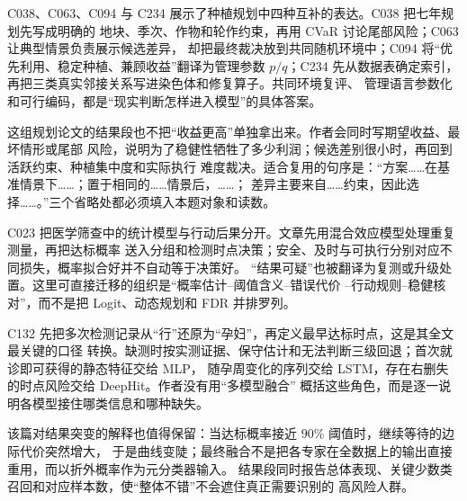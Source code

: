 C038、C063、C094 与 C234 展示了种植规划中四种互补的表达。C038 把七年规划先写成明确的
地块、季次、作物和轮作约束，再用 CVaR 讨论尾部风险；C063 让典型情景负责展示候选差异，
却把最终裁决放到共同随机环境中；C094 将“优先利用、稳定种植、兼顾收益”翻译为管理参数
$p/q$；C234 先从数据表确定索引，再把三类真实邻接关系写进染色体和修复算子。共同环境复评、
管理语言参数化和可行编码，都是“现实判断怎样进入模型”的具体答案。

这组规划论文的结果段也不把“收益更高”单独拿出来。作者会同时写期望收益、最坏情形或尾部
风险，说明为了稳健性牺牲了多少利润；候选差别很小时，再回到活跃约束、种植集中度和实际执行
难度裁决。适合复用的句序是：“方案……在基准情景下……；置于相同的……情景后，……；
差异主要来自……约束，因此选择……。”三个省略处都必须填入本题对象和读数。

C023 把医学筛查中的统计模型与行动后果分开。文章先用混合效应模型处理重复测量，再把达标概率
送入分组和检测时点决策；安全、及时与可执行分别对应不同损失，概率拟合好并不自动等于决策好。
“结果可疑”也被翻译为复测或升级处置。这里可直接迁移的组织是“概率估计--阈值含义--错误代价
--行动规则--稳健核对”，而不是把 Logit、动态规划和 FDR 并排罗列。

C132 先把多次检测记录从“行”还原为“孕妇”，再定义最早达标时点，这是其全文最关键的口径
转换。缺测时按实测证据、保守估计和无法判断三级回退；首次就诊即可获得的静态特征交给 MLP，
随孕周变化的序列交给 LSTM，存在右删失的时点风险交给 DeepHit。作者没有用“多模型融合”
概括这些角色，而是逐一说明各模型接住哪类信息和哪种缺失。

该篇对结果突变的解释也值得保留：当达标概率接近 $90\%$ 阈值时，继续等待的边际代价突然增大，
于是曲线变陡；最终融合不是把各专家在全数据上的输出直接重用，而以折外概率作为元分类器输入。
结果段同时报告总体表现、关键少数类召回和对应样本数，使“整体不错”不会遮住真正需要识别的
高风险人群。

